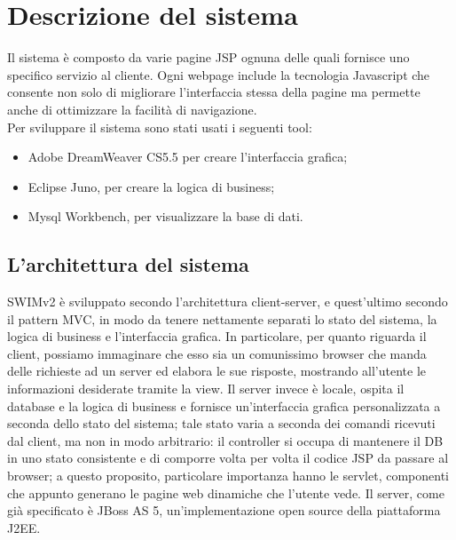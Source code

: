 \section{Descrizione del sistema}
Il sistema è composto da varie pagine JSP ognuna delle quali fornisce uno specifico servizio al cliente. Ogni webpage include la tecnologia Javascript che consente non solo di migliorare l’interfaccia stessa della pagine ma permette anche di ottimizzare la facilità di navigazione.\\[1\baselineskip]Per sviluppare il sistema sono stati usati i seguenti tool:
\begin{itemize}
\item Adobe DreamWeaver CS5.5 per creare l’interfaccia grafica;
\item Eclipse Juno, per creare la logica di business;
\item Mysql Workbench, per visualizzare la base di dati.
\end{itemize}

\vspace{1.2cm}

\subsection{L'architettura del sistema}

SWIMv2 è sviluppato secondo l'architettura client-server, e quest'ultimo secondo il pattern MVC, in modo da tenere nettamente separati lo stato del sistema, la logica di
business e l'interfaccia grafica. In particolare, per quanto riguarda il client, possiamo immaginare che esso sia un comunissimo browser che manda delle richieste ad un server ed
elabora le sue risposte, mostrando all'utente le informazioni desiderate tramite la view. Il server invece è locale, ospita il database e la logica di business e fornisce un'interfaccia grafica personalizzata a seconda dello stato del sistema; tale stato varia a seconda dei comandi ricevuti dal
client, ma non in modo arbitrario: il controller si occupa di mantenere il DB in uno stato consistente e di comporre volta per volta il codice JSP da passare al browser; a questo proposito,
particolare importanza hanno le servlet, componenti che appunto generano le pagine web dinamiche che l'utente vede. Il server, come già specificato è JBoss AS 5, un'implementazione
open source della piattaforma J2EE.
\\

